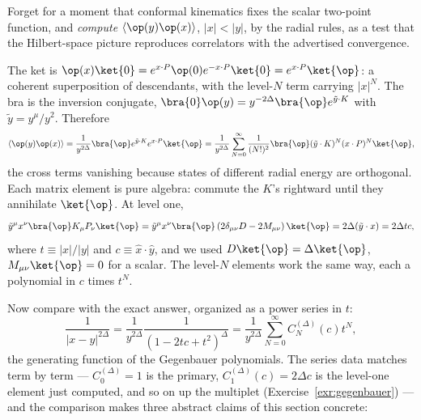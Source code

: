 \begin{eexample}
\label{ex:2pt-radial}
Forget for a moment that conformal kinematics fixes the scalar two-point
function, and \emph{compute} $\langle \op(y)\op(x)\rangle$, $|x| < |y|$, by
the radial rules, as a test that the Hilbert-space picture reproduces
correlators with the advertised convergence.

The ket is $\op(x)\ket{0} = e^{x\cdot P}\op(0)e^{-x\cdot P}\ket{0} =
e^{x\cdot P}\ket{\op}$: a coherent superposition of descendants, with the
level-$N$ term carrying $|x|^N$. The bra is the inversion conjugate,
$\bra{0}\op(y) = y^{-2\Delta}\bra{\op} e^{\tilde y \cdot K}$ with $\tilde
y = y^\mu/y^2$. Therefore
\begin{equation}
\langle \op(y) \op(x)\rangle
= \frac{1}{y^{2\Delta}}
\bra{\op} e^{\tilde y\cdot K} e^{x \cdot P}\ket{\op}
= \frac{1}{y^{2\Delta}}\sum_{N=0}^{\infty}
\frac{1}{(N!)^2}\bra{\op}(\tilde y\cdot K)^N (x\cdot P)^N\ket{\op},
\label{eq:2pt-matrix-elements}
\end{equation}
the cross terms vanishing because states of different radial energy are
orthogonal. Each matrix element is pure algebra: commute the $K$'s rightward
until they annihilate $\ket{\op}$. At level one,
\begin{equation}
\tilde y^\mu x^\nu \bra{\op} K_\mu P_\nu \ket{\op}
= \tilde y^\mu x^\nu \bra{\op}\left(2\delta_{\mu\nu} D - 2M_{\mu\nu}\right)\ket{\op}
= 2\Delta (\tilde y \cdot x)
= 2\Delta t c,
\end{equation}
where $t \equiv |x|/|y|$ and $c \equiv \hat x \cdot \hat y$, and we used
$D\ket{\op} = \Delta\ket{\op}$, $M_{\mu\nu}\ket{\op} = 0$ for a scalar. The
level-$N$ elements work the same way, each a polynomial in $c$ times $t^N$.

Now compare with the exact answer, organized as a power series in $t$:
\begin{equation}
\frac{1}{|x - y|^{2\Delta}}
= \frac{1}{y^{2\Delta}}\frac{1}{\left(1 - 2tc + t^2\right)^{\Delta}}
= \frac{1}{y^{2\Delta}} \sum_{N=0}^{\infty} C^{(\Delta)}_N(c) t^N ,
\label{eq:gegenbauer}
\end{equation}
the generating function of the Gegenbauer polynomials. The series data
matches term by term --- $C^{(\Delta)}_0 = 1$ is the primary,
$C^{(\Delta)}_1(c) = 2\Delta c$ is the level-one element just computed, and so
on up the multiplet (Exercise~\ref{exr:gegenbauer}) --- and the comparison
makes three abstract claims of this section concrete:


\end{eexample}
